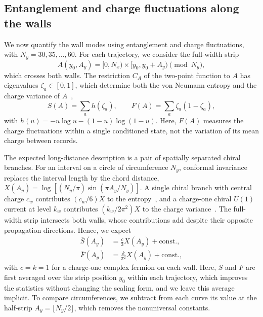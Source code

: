 \documentclass[aps,prb,twocolumn,superscriptaddress,longbibliography,floatfix]{revtex4-2}
\begin{document}
\subsection{Entanglement and charge fluctuations along the walls}
\label{sec:Entanglement}

We now quantify the wall modes using entanglement and charge fluctuations, with $N_y=30,35,\ldots,60$. For each trajectory, we consider the full-width strip
\begin{equation}
    A(y_0,A_y)=[0,N_x)\times[y_0,y_0+A_y)\pmod{N_y},
    \label{eq:Strip}
\end{equation}
which crosses both walls. The restriction $C_A$ of the two-point function to $A$ has eigenvalues $\zeta_a\in[0,1]$, which determine both the von Neumann entropy and the charge variance of $A$~\cite{KlichLevitov2009,SongFlindtRachel2011},
\begin{equation}
    S(A)=\sum_a h(\zeta_a),
    \qquad
    F(A)=\sum_a\zeta_a(1-\zeta_a),
    \label{eq:EntropyVariance}
\end{equation}
with $h(u)=-u\log u-(1-u)\log(1-u)$.
Here, $F(A)$ measures the charge fluctuations within a single conditioned state, not the variation of its mean charge between records.

The expected long-distance description is a pair of spatially separated chiral branches. For an interval on a circle of circumference $N_y$, conformal invariance replaces the interval length by the chord distance, $X(A_y)=\log[(N_y/\pi)\sin(\pi A_y/N_y)]$. A single chiral branch with central charge $c_w$ contributes $(c_w/6)X$ to the entropy~\cite{CalabreseCardy2004}, and a charge-one chiral $U(1)$ current at level $k_w$ contributes $(k_w/2\pi^2)X$ to the charge variance~\cite{DiFrancescoMathieuSenechal1997}. The full-width strip intersects both walls, whose contributions add despite their opposite propagation directions. Hence, we expect
\begin{align}
    \overline{S}(A_y)&=\frac{c}{3}X(A_y)+\text{const.},\nonumber\\
    \overline{F}(A_y)&=\frac{k}{\pi^2}X(A_y)+\text{const.},
    \label{eq:CFTScaling}
\end{align}
with $c=k=1$ for a charge-one complex fermion on each wall. Here, $S$ and $F$ are first averaged over the strip position $y_0$ within each trajectory, which improves the statistics without changing the scaling form, and we leave this average implicit. To compare circumferences, we subtract from each curve its value at the half-strip $A_y=\lfloor N_y/2\rfloor$, which removes the nonuniversal constants.
\end{document}
